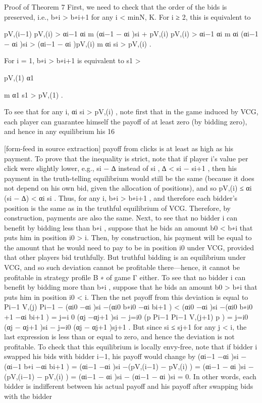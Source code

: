 \documentclass[10pt]{article}
\begin{document}
\begin{ReviewVerbatim}

Proof of Theorem 7
First, we need to check that the order of the bids is preserved, i.e., b∗i > b∗i+1 for any i < min{N, K}.
For i ≥ 2, this is equivalent to

pV,(i−1)
pV,(i)
>
αi−1
αi
m
(αi−1 − αi )si + pV,(i)
pV,(i)
>
αi−1
αi
m
αi (αi−1 − αi )si > (αi−1 − αi )pV,(i)
m
αi si > pV,(i) .

For i = 1, b∗i > b∗i+1 is equivalent to
s1 >

pV,(1)
α1

m
α1 s1 > pV,(1) .

To see that for any i, αi si > pV,(i) , note first that in the game induced by VCG, each player can
guarantee himself the payoff of at least zero (by bidding zero), and hence in any equilibrium his
16


[form-feed in source extraction]
payoff from clicks is at least as high as his payment. To prove that the inequality is strict, note
that if player i’s value per click were slightly lower, e.g., si − ∆ instead of si , ∆ < si − si+1 , then
his payment in the truth-telling equilibrium would still be the same (because it does not depend on
his own bid, given the allocation of positions), and so pV,(i) ≤ αi (si − ∆) < αi si . Thus, for any i,
b∗i > b∗i+1 , and therefore each bidder’s position is the same as in the truthful equilibrium of VCG.
Therefore, by construction, payments are also the same.
Next, to see that no bidder i can benefit by bidding less than b∗i , suppose that he bids an amount
b0 < b∗i that puts him in position i0 > i. Then, by construction, his payment will be equal to the
amount that he would need to pay to be in position i0 under VCG, provided that other players bid
truthfully. But truthful bidding is an equilibrium under VCG, and so such deviation cannot be
profitable there—hence, it cannot be profitable in strategy profile B ∗ of game Γ either.
To see that no bidder i can benefit by bidding more than b∗i , suppose that he bids an amount
b0 > b∗i that puts him in position i0 < i. Then the net payoff from this deviation is equal to
Pi−1 V,(j)
Pi−1
−
(αi0 −αi )si −(αi0 b∗i0 −αi bi+1 ) < (αi0 −αi )si −(αi0 b∗i0 +1 −αi bi+1 ) = j=i
0 (αj −αj+1 )si −
j=i0 (p
Pi−1
Pi−1
V,(j+1)
p
) = j=i0 (αj − αj+1 )si − j=i0 (αj − αj+1 )sj+1 . But since si ≤ sj+1 for any j < i, the last
expression is less than or equal to zero, and hence the deviation is not profitable.
To check that this equilibrium is locally envy-free, note that if bidder i swapped his bids with
bidder i−1, his payoff would change by (αi−1 −αi )si −(αi−1 b∗i −αi bi+1 ) = (αi−1 −αi )si −(pV,(i−1) −
pV,(i) ) = (αi−1 − αi )si − (pV,(i−1) − pV,(i) ) = (αi−1 − αi )si − (αi−1 − αi )si = 0. In other words, each
bidder is indifferent between his actual payoff and his payoff after swapping bids with the bidder
\end{ReviewVerbatim}
\end{document}

